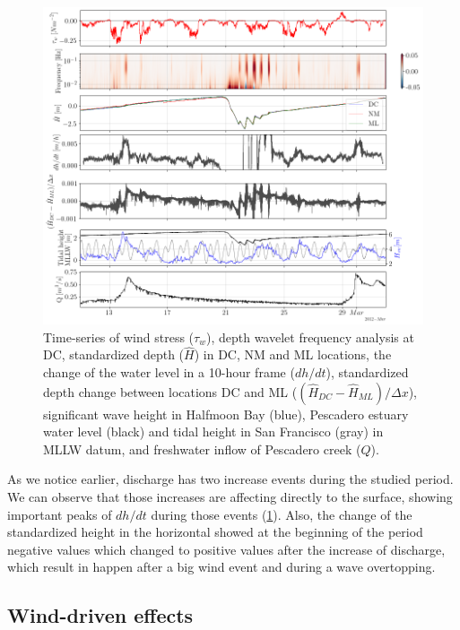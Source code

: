 \documentclass[tesis.tex]{subfiles}
\begin{document}
\begin{figure}[h!]
    \centering
    \includegraphics[width=\textwidth]{Imagenes/surf.png}
    \caption{Time-series of wind stress ($\tau_w$), depth wavelet frequency analysis at DC, standardized depth ($\hat{H}$) in DC, NM and ML locations, the change of the water level in a 10-hour frame ($dh/dt$), standardized depth change between locations DC and ML ($(\hat{H}_{DC}-\hat{H}_{ML})/\Delta x$), significant wave height in Halfmoon Bay (blue), Pescadero estuary water level (black) and tidal height in San Francisco (gray) in MLLW datum, and freshwater inflow of Pescadero creek ($Q$).}
    \label{fig:surf}
\end{figure}

As we notice earlier, discharge has two increase events during the studied period. We can observe that those increases are affecting directly to the surface, showing important peaks of $dh/dt$ during those events (\ref{fig:surf}). Also, the change of the standardized height in the horizontal showed at the beginning of the period negative values which changed to positive values after the increase of discharge, which result in happen after a big wind event and during a wave overtopping.\\

\subsection{Wind-driven effects}
\end{document}
